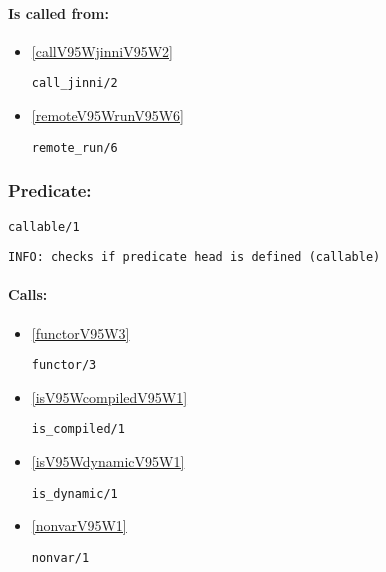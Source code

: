 \paragraph{Is called from:} 
\begin{itemize}
\item \ref{callV95WjinniV95W2} 
\begin{verbatim}
call_jinni/2
\end{verbatim}

\item \ref{remoteV95WrunV95W6} 
\begin{verbatim}
remote_run/6
\end{verbatim}

\end{itemize}

\subsubsection{Predicate:} \label{callableV95W1}

\begin{verbatim}
callable/1
\end{verbatim}

{\small \begin{verbatim}
INFO: checks if predicate head is defined (callable)

\end{verbatim}}
\paragraph{Calls:} 
\begin{itemize}
\item \ref{functorV95W3} 
\begin{verbatim}
functor/3
\end{verbatim}

\item \ref{isV95WcompiledV95W1} 
\begin{verbatim}
is_compiled/1
\end{verbatim}

\item \ref{isV95WdynamicV95W1} 
\begin{verbatim}
is_dynamic/1
\end{verbatim}

\item \ref{nonvarV95W1} 
\begin{verbatim}
nonvar/1
\end{verbatim}

\end{itemize}
